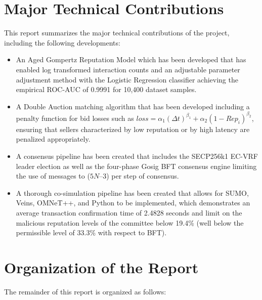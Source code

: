 \section{Major Technical Contributions}\label{sec:intro_contributions}
\noindent This report summarizes the major technical contributions of the project, including the following developments:
\begin{itemize}
    \item An Aged Gompertz Reputation Model which has been developed that has enabled log transformed interaction counts and an adjustable parameter adjustment method with the Logistic Regression classifier achieving the empirical ROC-AUC of 0.9991 for 10,400 dataset samples.
    \item A Double Auction matching algorithm that has been developed including a penalty function for bid losses such as  $loss = \alpha_1 (\Delta t)^{\beta_1} + \alpha_2 (1 - Rep_i)^{\beta_2}$, ensuring that sellers characterized by low reputation or by high latency are penalized appropriately.
    \item A consensus pipeline has been created that includes the SECP256k1 EC-VRF leader election as well as the four-phase Gosig BFT consensus engine limiting the use of messages to ($5N – 3$) per step of consensus.
    \item A thorough co-simulation pipeline has been created that allows for SUMO, Veins, OMNeT++, and Python to be implemented, which demonstrates an average transaction confirmation time of 2.4828 seconds and limit on the malicious reputation levels of the committee below 19.4\% (well below the permissible level of 33.3\% with respect to BFT).




\end{itemize}

\section{Organization of the Report}\label{sec:intro_organization}

\noindent The remainder of this report is organized as follows:

